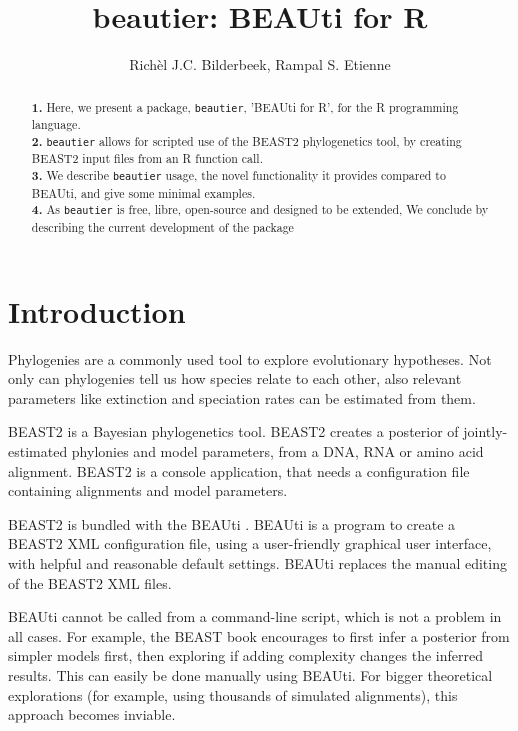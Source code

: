 \documentclass{article}
\title{beautier: BEAUti for R}
\author{Rich\`el J.C. Bilderbeek, Rampal S. Etienne}
\begin{document}
\maketitle

\begin{abstract}
  \textbf{1. }
  Here, we present a package, \verb;beautier;, 'BEAUti for R', for the R programming language. \\
  \textbf{2. }
    \verb;beautier; allows for scripted use of the BEAST2 phylogenetics tool, 
    by creating BEAST2 input files from an R function call. \\
  \textbf{3. }
    We describe \verb;beautier; usage, the novel functionality it provides
    compared to BEAUti, and give some minimal examples. \\
  \textbf{4. }
    As \verb;beautier; is free, libre, open-source and designed to be extended, 
    We conclude by describing the current development of the package \\
\end{abstract}


\section{Introduction}

Phylogenies are a commonly used tool to explore evolutionary hypotheses.
Not only can phylogenies tell us how species relate to each other, also relevant parameters like
extinction and speciation rates can be estimated from them.

BEAST2 \cite{bouckaert2014beast} is a Bayesian phylogenetics tool.
BEAST2 creates a posterior of jointly-estimated phylonies and model
parameters, from a DNA, RNA or amino acid alignment. BEAST2 is a 
console application, that needs a configuration file containing alignments and model parameters.

BEAST2 is bundled with the BEAUti \cite{drummond2012bayesian}. 
BEAUti is a program to create a BEAST2 XML configuration file, 
using a user-friendly graphical user interface, with helpful and reasonable 
default settings. BEAUti replaces the manual editing of the BEAST2 XML
files. 

BEAUti cannot be called from a command-line script, which is not a problem in all cases.
For example, the BEAST book \cite{drummond2015bayesian} encourages to first infer a posterior
from simpler models first, then exploring if adding complexity changes the inferred results.
This can easily be done manually using BEAUti. 
For bigger theoretical explorations (for example, using thousands of simulated alignments), this approach
becomes inviable. 
\end{document}
